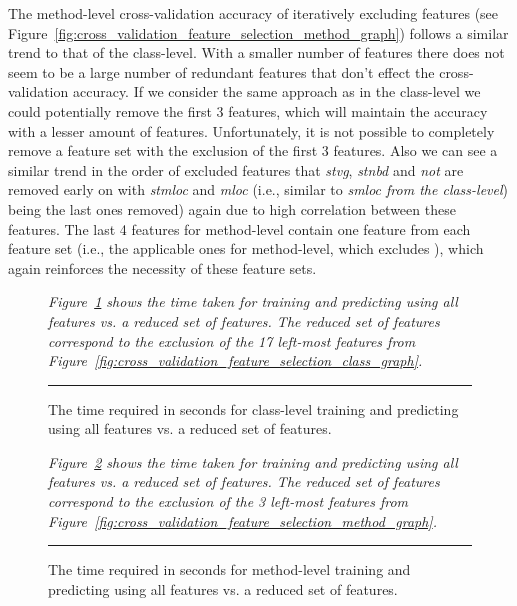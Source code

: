 The method-level cross-validation accuracy of iteratively excluding features (see Figure~\ref{fig:cross_validation_feature_selection_method_graph}) follows a similar trend to that of the class-level. With a smaller number of features there does not seem to be a large number of redundant features that don't effect the cross-validation accuracy. If we consider the same approach as in the class-level we could potentially remove the first 3 features, which will maintain the accuracy with a lesser amount of features. Unfortunately, it is not possible to completely remove a feature set with the exclusion of the first 3 features. Also we can see a similar trend in the order of excluded features that \emph{stvg}, \emph{stnbd} and \emph{not} are removed early on with \emph{stmloc} and \emph{mloc} (i.e., similar to \emph{smloc from the class-level}) being the last ones removed) again due to high correlation between these features. The last 4 features for method-level contain one feature from each feature set (i.e., the applicable ones for method-level, which excludes ), which again reinforces the necessity of these feature sets.

\begin{figure}[ht!]
  \centering
  \begin{adjustbox}{max size={.95\textwidth}{.95\textheight}}
    
  \end{adjustbox}
  \caption{The time required in seconds for class-level training and predicting using all features vs. a reduced set of features.}  \vspace{1mm}
  \footnotesize{\emph{Figure~\ref{fig:class_train_prediction_default_time_graph} shows the time taken for training and predicting using all features vs. a reduced set of features. The reduced set of features correspond to the exclusion of the 17 left-most features from Figure~\ref{fig:cross_validation_feature_selection_class_graph}.}}
  \vspace{2mm}
  \hrule
  \label{fig:class_train_prediction_default_time_graph}
\end{figure}

\begin{figure}[ht!]
  \centering
  \begin{adjustbox}{max size={.95\textwidth}{.95\textheight}}
    
  \end{adjustbox}
  \caption{The time required in seconds for method-level training and predicting using all features vs. a reduced set of features.}
  \vspace{1mm}
  \footnotesize{\emph{Figure~\ref{fig:method_train_prediction_default_time_graph} shows the time taken for training and predicting using all features vs. a reduced set of features. The reduced set of features correspond to the exclusion of the 3 left-most features from Figure~\ref{fig:cross_validation_feature_selection_method_graph}.}}
  \vspace{2mm}
  \hrule
  \label{fig:method_train_prediction_default_time_graph}
\end{figure}

